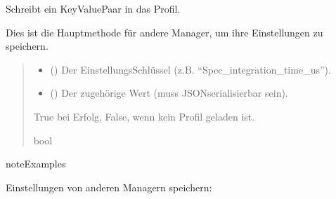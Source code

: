 \documentclass[letterpaper,10pt,english]{sphinxmanual}
\begin{document}
\begin{fulllineitems}
\begin{fulllineitems}
\label{\detokenize{modulab/profile_manager:modules.profile.ProfileManager.ProfileManager.write}}
\pysigstartsignatures
\pysiglinewithargsret
{}
{\sphinxparamcomma {}}
{}
\pysigstopsignatures
\sphinxAtStartPar
Schreibt ein Key\sphinxhyphen{}Value\sphinxhyphen{}Paar in das  Profil.

\sphinxAtStartPar
Dies ist die Hauptmethode für andere Manager, um ihre
Einstellungen zu speichern.
\begin{quote}\begin{description}
\begin{itemize}
\item {} 
\sphinxAtStartPar
{} () \textendash{} Der Einstellungs\sphinxhyphen{}Schlüssel (z.B. “Spec\_integration\_time\_us”).

\item {} 
\sphinxAtStartPar
{} () \textendash{} Der zugehörige Wert (muss JSON\sphinxhyphen{}serialisierbar sein).

\end{itemize}

\sphinxAtStartPar
True bei Erfolg, False, wenn kein Profil geladen ist.

\sphinxAtStartPar
bool

\end{description}\end{quote}

\begin{sphinxadmonition}{note}{Examples}

\sphinxAtStartPar
Einstellungen von anderen Managern speichern:

\begin{sphinxVerbatim}[commandchars=\\\{\}]
  
 


\end{sphinxVerbatim}
\end{sphinxadmonition}
\end{fulllineitems}
\end{fulllineitems}
\end{document}
